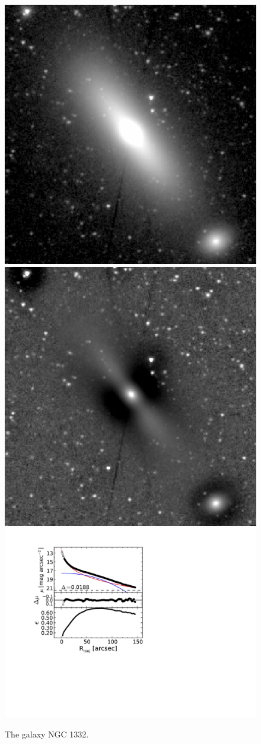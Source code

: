 \documentclass[useAMS,usenatbib,article]{mn2e}
\begin{document}
\begin{figure}
\begin{center}
\includegraphics[width=0.49\columnwidth]{images/n1332_image}
\includegraphics[width=0.49\columnwidth]{images/n1332_unsharp} \\
\includegraphics[width=1.03\columnwidth]{images/n1332_decomposition.pdf}
\caption{The galaxy NGC 1332. 
}
\end{center}
\end{figure}
\end{document}
